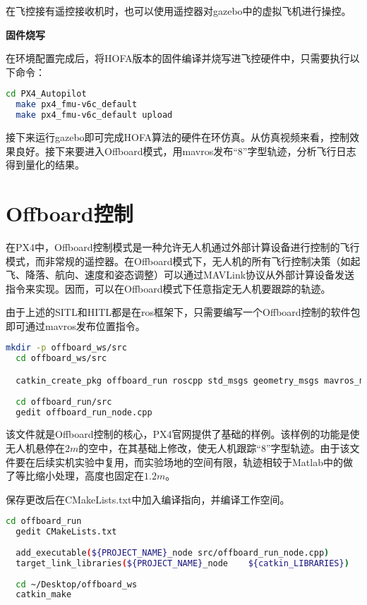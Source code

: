 在飞控接有遥控接收机时，也可以使用遥控器对gazebo中的虚拟飞机进行操控。

\textbf{固件烧写}

在环境配置完成后，将HOFA版本的固件编译并烧写进飞控硬件中，只需要执行以下命令：

\begin{lstlisting}[language=Bash, basicstyle=\footnotesize, linewidth=\linewidth, breaklines=true]
  cd PX4_Autopilot
  make px4_fmu-v6c_default
  make px4_fmu-v6c_default upload
\end{lstlisting}

接下来运行gazebo即可完成HOFA算法的硬件在环仿真。从仿真视频来看，控制效果良好。接下来要进入Offboard模式，用mavros发布“8”字型轨迹，分析飞行日志得到量化的结果。

\section{Offboard控制}

在PX4中，Offboard控制模式是一种允许无人机通过外部计算设备进行控制的飞行模式，而非常规的遥控器。在Offboard模式下，无人机的所有飞行控制决策（如起飞、降落、航向、速度和姿态调整）可以通过MAVLink协议从外部计算设备发送指令来实现。因而，可以在Offboard模式下任意指定无人机要跟踪的轨迹。

由于上述的SITL和HITL都是在ros框架下，只需要编写一个Offboard控制的软件包即可通过mavros发布位置指令。

\begin{lstlisting}[language=Bash, basicstyle=\footnotesize, linewidth=\linewidth, breaklines=true]
  mkdir -p offboard_ws/src
  cd offboard_ws/src

  catkin_create_pkg offboard_run roscpp std_msgs geometry_msgs mavros_msgs
  
  cd offboard_run/src
  gedit offboard_run_node.cpp
\end{lstlisting}

该文件就是Offboard控制的核心，PX4官网提供了基础的样例\cite{Offboard}。该样例的功能是使无人机悬停在$2m$的空中，在其基础上修改，使无人机跟踪“8”字型轨迹。由于该文件要在后续实机实验中复用，而实验场地的空间有限，轨迹相较于Matlab中的做了等比缩小处理，高度也固定在$1.2m$。

保存更改后在CMakeLists.txt中加入编译指向，并编译工作空间。

\begin{lstlisting}[language=Bash, basicstyle=\footnotesize, linewidth=\linewidth, breaklines=true]
  cd offboard_run
  gedit CMakeLists.txt
  
  add_executable(${PROJECT_NAME}_node src/offboard_run_node.cpp)
  target_link_libraries(${PROJECT_NAME}_node    ${catkin_LIBRARIES})
  
  cd ~/Desktop/offboard_ws
  catkin_make
\end{lstlisting}
  
